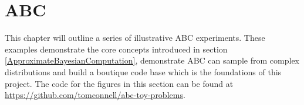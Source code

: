 \chapter{ABC}

This chapter will outline a series of illustrative ABC experiments. These examples demonstrate the core concepts introduced in section \ref{ApproximateBayesianComputation}, demonstrate ABC can sample from complex distributions and build a boutique code base which is the foundations of this project. The code for the figures in this section can be found at \url{https://github.com/tomconnell/abc-toy-problems}.




